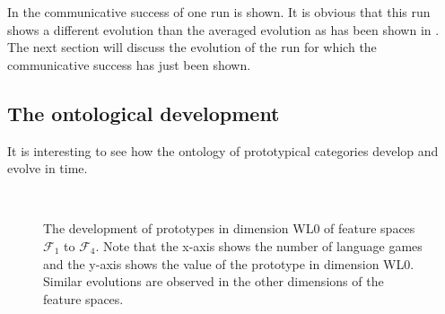 In  the communicative success of one run is shown. It is obvious that this run shows a different evolution than the averaged evolution as has been shown in . The next section will discuss the evolution of the run for which the communicative success has just been shown.

\subsection{The ontological development}\label{s:cat:evol}

It is interesting to see how the ontology of prototypical categories develop and evolve in time.

\begin{figure}[t]
\centering
{}
\\
\caption{The development of prototypes in dimension WL0 of feature spaces ${\mathcal F}_1$ to ${\mathcal F}_4$. Note that the x-axis shows the number of language games and the y-axis shows the value of the prototype in dimension WL0. Similar evolutions are observed in the other dimensions of the feature spaces.}
\label{f:cat:evol1}
\end{figure}


